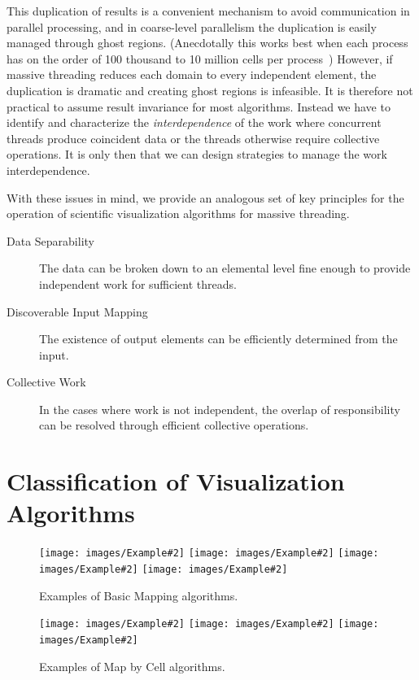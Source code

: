 \documentclass{sig-alternate}
\newcommand*{\lcite}[1]{~\cite{#1}}
\newcommand*{\keyterm}[1]{\emph{#1}}
\newcommand{\algclass}[1]{\textsf{#1}}
\newcommand{\exampleimage}[2][.24]{\texttt{[image: images/Example\#2]}}
\begin{document}
This duplication of results is a convenient mechanism to avoid
communication in parallel processing, and in coarse-level parallelism the
duplication is easily managed through ghost regions. (Anecdotally this
works best when each process has on the order of 100 thousand to 10 million
cells per process\lcite{ParaViewTutorial}) However, if massive threading
reduces each domain to every independent element, the duplication is
dramatic and creating ghost regions is infeasible. It is therefore not
practical to assume result invariance for most algorithms. Instead we have
to identify and characterize the \keyterm{interdependence} of the work
where concurrent threads produce coincident data or the threads otherwise
require collective operations. It is only then that we can design
strategies to manage the work interdependence.

With these issues in mind, we provide an analogous set of key principles
for the operation of scientific visualization algorithms for massive
threading.

\begin{description}
\item[Data Separability] The data can be broken down to an elemental level
  fine enough to provide independent work for sufficient threads.
\item[Discoverable Input Mapping] The existence of output elements can be
  efficiently determined from the input.
\item[Collective Work] In the cases where work is not independent, the
  overlap of responsibility can be resolved through efficient collective
  operations.
\end{description}


\section{Classification of Visualization Algorithms}
\label{sec:Classification}

\begin{figure}
  \centering
  \exampleimage{Elevation}
  \exampleimage{GenerateIds}
  \exampleimage{SurfaceVectors}
  \exampleimage{Warp}
  \caption{Examples of \algclass{Basic Mapping} algorithms.}
  \label{fig:BasicMapping}
\end{figure}

\begin{figure}[hbt]
  \centering
  \exampleimage[.3]{CellCenters}
  \exampleimage[.3]{CellDerivatives}
  \exampleimage[.3]{MeshQuality}
  \caption{Examples of \algclass{Map by Cell} algorithms.}
  \label{fig:MapByCell}
\end{figure}
\end{document}
